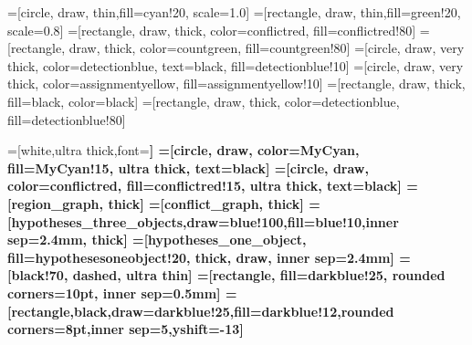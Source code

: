 =[circle, draw, thin,fill=cyan!20, scale=1.0]
=[rectangle, draw, thin,fill=green!20, scale=0.8]
=[rectangle, draw, thick, color=conflictred, fill=conflictred!80]
=[rectangle, draw, thick, color=countgreen, fill=countgreen!80]
=[circle, draw, very thick, color=detectionblue, text=black, fill=detectionblue!10]
=[circle, draw, very thick, color=assignmentyellow, fill=assignmentyellow!10]
=[rectangle, draw, thick, fill=black, color=black]
=[rectangle, draw, thick, color=detectionblue, fill=detectionblue!80]


=[white,ultra thick,font=\bfseries]
=[circle, draw, color=MyCyan, fill=MyCyan!15, ultra thick, text=black]
=[circle, draw, color=conflictred, fill=conflictred!15, ultra thick, text=black]
=[region_graph, thick]
=[conflict_graph, thick]
=[hypotheses_three_objects,draw=blue!100,fill=blue!10,inner sep=2.4mm, thick]
=[hypotheses_one_object, fill=hypothesesoneobject!20, thick, draw, inner
sep=2.4mm]
=[black!70, dashed, ultra thin]
=[rectangle, fill=darkblue!25, rounded corners=10pt, inner sep=0.5mm]
=[rectangle,black,draw=darkblue!25,fill=darkblue!12,rounded corners=8pt,inner
sep=5,yshift=-13]

\tikzfading[name=arrowfading, top color=transparent!0, bottom color=transparent!95]

\newcommand{\tikzfancyarrow}[2][2cm]{\tikz[baseline=-0.5ex]\node [arrowstyle=#1] {#2};}


